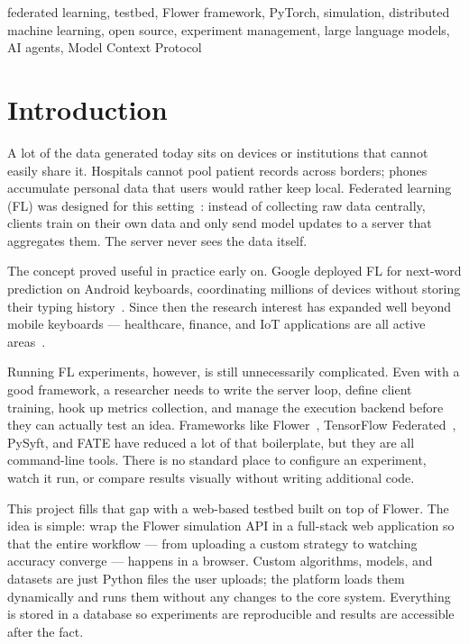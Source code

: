 \documentclass[conference]{IEEEtran}
\begin{document}
\begin{IEEEkeywords}
federated learning, testbed, Flower framework, PyTorch, simulation,
distributed machine learning, open source, experiment management,
large language models, AI agents, Model Context Protocol
\end{IEEEkeywords}

\section{Introduction}
\label{sec:introduction}

A lot of the data generated today sits on devices or institutions that
cannot easily share it.
Hospitals cannot pool patient records across borders; phones accumulate
personal data that users would rather keep local.
Federated learning (FL) was designed for this setting~\cite{mcmahan2017communication}:
instead of collecting raw data centrally, clients train on their own data
and only send model updates to a server that aggregates them.
The server never sees the data itself.

The concept proved useful in practice early on.
Google deployed FL for next-word prediction on Android keyboards,
coordinating millions of devices without storing their typing
history~\cite{bonawitz2019towards}.
Since then the research interest has expanded well beyond mobile
keyboards --- healthcare, finance, and IoT applications are all active
areas~\cite{kairouz2021advances}.

Running FL experiments, however, is still unnecessarily complicated.
Even with a good framework, a researcher needs to write the server loop,
define client training, hook up metrics collection, and manage the
execution backend before they can actually test an idea.
Frameworks like Flower~\cite{beutel2020flower},
TensorFlow Federated~\cite{tensorflow_federated}, PySyft, and FATE have
reduced a lot of that boilerplate, but they are all command-line tools.
There is no standard place to configure an experiment, watch it run,
or compare results visually without writing additional code.

This project fills that gap with a web-based testbed built on top of Flower.
The idea is simple: wrap the Flower simulation API in a full-stack
web application so that the entire workflow --- from uploading a custom
strategy to watching accuracy converge --- happens in a browser.
Custom algorithms, models, and datasets are just Python files the user
uploads; the platform loads them dynamically and runs them without
any changes to the core system.
Everything is stored in a database so experiments are reproducible and
results are accessible after the fact.
\end{document}
